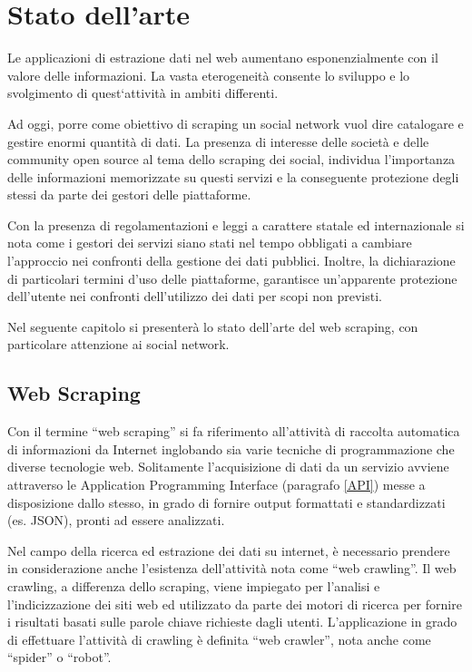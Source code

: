 \chapter{Stato dell'arte}
\label{chap:stato_arte}
Le applicazioni di estrazione dati nel web aumentano esponenzialmente con il valore delle informazioni. La vasta eterogeneit\`a consente lo sviluppo e lo svolgimento di quest`attivit\`a in ambiti differenti. 

Ad oggi, porre come obiettivo di scraping un social network vuol dire catalogare e gestire enormi quantit\`a di dati. La presenza di interesse delle societ\`a e delle community open source al tema dello scraping dei social, individua l'importanza delle informazioni memorizzate su questi servizi e la conseguente protezione degli stessi da parte dei gestori delle piattaforme. 

Con la presenza di regolamentazioni e leggi a carattere statale ed internazionale si nota come i gestori dei servizi siano stati nel tempo obbligati a cambiare l'approccio nei confronti della gestione dei dati pubblici. Inoltre, la dichiarazione di particolari termini d'uso delle piattaforme, garantisce un'apparente protezione dell'utente nei confronti dell'utilizzo dei dati per scopi non previsti.

Nel seguente capitolo si presenter\`a lo stato dell'arte del web scraping, con particolare attenzione ai social network.
\newpage
\section{Web Scraping}
Con il termine ``web scraping'' si fa riferimento all'attivit\`a di raccolta automatica di informazioni da Internet inglobando sia varie tecniche di programmazione che diverse tecnologie web.
Solitamente l'acquisizione di dati da un servizio avviene attraverso le Application Programming Interface (paragrafo \ref{API}) messe a disposizione dallo stesso, in grado di fornire output formattati e standardizzati (es. JSON), pronti ad essere analizzati.\cite{mitchell2018web}

Nel campo della ricerca ed estrazione dei dati su internet, \`e necessario prendere in considerazione anche l'esistenza dell'attivit\`a nota come ``web crawling''. Il web crawling, a differenza dello scraping, viene impiegato per l'analisi e l'indicizzazione dei siti web ed utilizzato da parte dei motori di ricerca per fornire i risultati basati sulle parole chiave richieste dagli utenti. L'applicazione in grado di effettuare l'attivit\`a di crawling \`e definita ``web crawler'', nota anche come ``spider'' o ``robot''.\cite{olston2010web}

